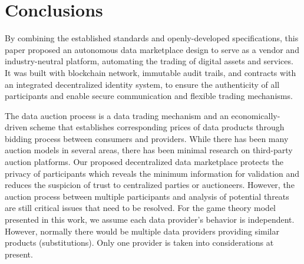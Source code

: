 \documentclass[journal,article,applsci,submit,moreauthors,pdftex]{Definitions/mdpi}
\begin{document}
\section{Conclusions}
By combining the established standards and openly-developed specifications, this paper proposed an autonomous data marketplace design to serve as a vendor and industry-neutral platform, automating the trading of digital assets and services. It was built with blockchain network, immutable audit trails, and contracts with an integrated decentralized identity system, to ensure the authenticity of all participants and enable secure communication and flexible trading mechanisms.

The data auction process is a data trading mechanism and an economically-driven scheme that establishes corresponding prices of data products through bidding process between consumers and providers. While there has been many auction models\cite{BigPicDataMarket} in several areas, there has been minimal research on third-party auction platforms. Our proposed decentralized data marketplace protects the privacy of participants which reveals the minimum information for validation and reduces the suspicion of trust to centralized parties or auctioneers. However, the auction process between multiple participants and analysis of potential threats are still critical issues that need to be resolved. For the game theory model presented in this work, we assume each data provider's behavior is independent. However, normally there would be multiple data providers providing similar products (substitutions). Only one provider is taken into considerations at present.




\end{document}
